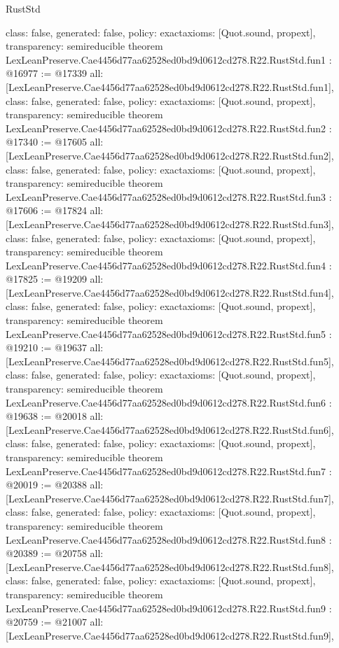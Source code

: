\begin{lexlean}{RustStd}
\begin{coremodule}
{  class: false,
  generated: false,
  policy: exact{axioms: [Quot.sound, propext]},
  transparency: semireducible
}
theorem LexLeanPreserve.Cae4456d77aa62528ed0bd9d0612cd278.R22.RustStd.fun1 : @16977 := @17339 {
  all: [LexLeanPreserve.Cae4456d77aa62528ed0bd9d0612cd278.R22.RustStd.fun1],
  class: false,
  generated: false,
  policy: exact{axioms: [Quot.sound, propext]},
  transparency: semireducible
}
theorem LexLeanPreserve.Cae4456d77aa62528ed0bd9d0612cd278.R22.RustStd.fun2 : @17340 := @17605 {
  all: [LexLeanPreserve.Cae4456d77aa62528ed0bd9d0612cd278.R22.RustStd.fun2],
  class: false,
  generated: false,
  policy: exact{axioms: [Quot.sound, propext]},
  transparency: semireducible
}
theorem LexLeanPreserve.Cae4456d77aa62528ed0bd9d0612cd278.R22.RustStd.fun3 : @17606 := @17824 {
  all: [LexLeanPreserve.Cae4456d77aa62528ed0bd9d0612cd278.R22.RustStd.fun3],
  class: false,
  generated: false,
  policy: exact{axioms: [Quot.sound, propext]},
  transparency: semireducible
}
theorem LexLeanPreserve.Cae4456d77aa62528ed0bd9d0612cd278.R22.RustStd.fun4 : @17825 := @19209 {
  all: [LexLeanPreserve.Cae4456d77aa62528ed0bd9d0612cd278.R22.RustStd.fun4],
  class: false,
  generated: false,
  policy: exact{axioms: [Quot.sound, propext]},
  transparency: semireducible
}
theorem LexLeanPreserve.Cae4456d77aa62528ed0bd9d0612cd278.R22.RustStd.fun5 : @19210 := @19637 {
  all: [LexLeanPreserve.Cae4456d77aa62528ed0bd9d0612cd278.R22.RustStd.fun5],
  class: false,
  generated: false,
  policy: exact{axioms: [Quot.sound, propext]},
  transparency: semireducible
}
theorem LexLeanPreserve.Cae4456d77aa62528ed0bd9d0612cd278.R22.RustStd.fun6 : @19638 := @20018 {
  all: [LexLeanPreserve.Cae4456d77aa62528ed0bd9d0612cd278.R22.RustStd.fun6],
  class: false,
  generated: false,
  policy: exact{axioms: [Quot.sound, propext]},
  transparency: semireducible
}
theorem LexLeanPreserve.Cae4456d77aa62528ed0bd9d0612cd278.R22.RustStd.fun7 : @20019 := @20388 {
  all: [LexLeanPreserve.Cae4456d77aa62528ed0bd9d0612cd278.R22.RustStd.fun7],
  class: false,
  generated: false,
  policy: exact{axioms: [Quot.sound, propext]},
  transparency: semireducible
}
theorem LexLeanPreserve.Cae4456d77aa62528ed0bd9d0612cd278.R22.RustStd.fun8 : @20389 := @20758 {
  all: [LexLeanPreserve.Cae4456d77aa62528ed0bd9d0612cd278.R22.RustStd.fun8],
  class: false,
  generated: false,
  policy: exact{axioms: [Quot.sound, propext]},
  transparency: semireducible
}
theorem LexLeanPreserve.Cae4456d77aa62528ed0bd9d0612cd278.R22.RustStd.fun9 : @20759 := @21007 {
  all: [LexLeanPreserve.Cae4456d77aa62528ed0bd9d0612cd278.R22.RustStd.fun9],
}
\end{coremodule}
\end{lexlean}
